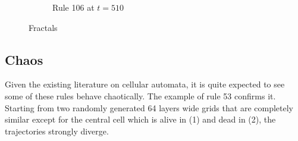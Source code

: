 \documentclass{article}
\begin{document}
\begin{figure}[H]
\begin{subfigure}[b]{0.46\textwidth}
        \caption{Rule 106 at $t=510$}
        \label{fig:rule-106-time-510-OneAlive}
    \end{subfigure}
    \caption{Fractals}
    \label{fig:fractals}
\end{figure}

\pagebreak
\subsection{Chaos} \label{chaos}
Given the existing literature on cellular automata, it is quite expected to see some of these rules behave chaotically. The example of rule 53 confirms it. Starting from two randomly generated 64 layers wide grids that are completely similar except for the central cell which is alive in (1) and dead in (2), the trajectories strongly diverge.

\bigskip
\end{document}
